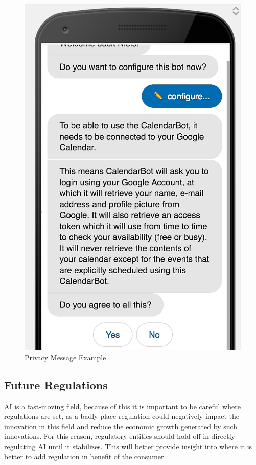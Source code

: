 \begin{center}
	\begin{figure}[h!]
		\centering
		\includegraphics[scale=0.2]{./images/2-priv-first}
		\caption{Privacy Message Example}
		\label{priv-msg}
	\end{figure}
\end{center}





\subsection{Future Regulations}\label{sec:chap2_fut_ref}
AI is a fast-moving field, because of this it is important to be careful where regulations are set, as a badly place regulation could negatively impact the innovation in this field and reduce the economic growth generated by such innovations. For this reason, regulatory entities should hold off in directly regulating AI until it stabilizes. This will better provide insight into where it is better to add regulation in benefit of the consumer.\\

